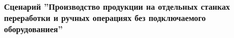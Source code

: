 \begin{comment}
\item После этого вносить изменения в документ сможет только пользователь, обладающий соответствующими правами. Установка данного признака позволяет обезопасить документ в системе \gofro от последующих несанкционированных изменений пользователями.

\item Ответственным за верное заполнение отчётов по выработке является \master.


\end{enumerate}



\end{comment}





\subsubsection{Сценарий ''Производство продукции на отдельных станках переработки и ручных операциях без подключаемого оборудованиея''}
\label{bp:production_21}

